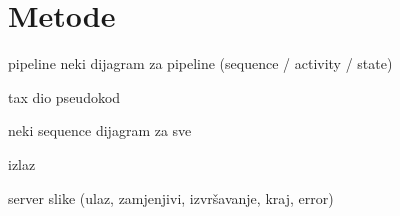 \chapter{Metode}
\label{chap:metode}

pipeline neki dijagram za pipeline (sequence / activity / state)

tax dio pseudokod

neki sequence dijagram za sve

izlaz

server slike (ulaz, zamjenjivi, izvršavanje, kraj, error)
